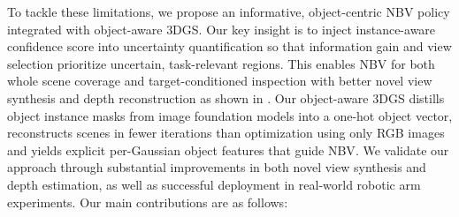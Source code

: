 


To tackle these limitations, we propose an informative, object-centric \ac{NBV} policy integrated with object-aware \ac{3DGS}.
Our key insight is to inject instance-aware confidence score into uncertainty quantification so that information gain and view selection prioritize uncertain, task-relevant regions. This enables \ac{NBV} for both whole scene coverage and target-conditioned inspection with better novel view synthesis and depth reconstruction as shown in .
Our object-aware \ac{3DGS} distills object instance masks from image foundation models \cite{liu2024grounding, kirillov2023segment, ren2024grounded} into a one-hot object vector, reconstructs scenes in fewer iterations than optimization using only RGB images and yields explicit per-Gaussian object features that guide \ac{NBV}.
We validate our approach through substantial improvements in both novel view synthesis and depth estimation, as well as successful deployment in real-world robotic arm experiments.
Our main contributions are as follows:



